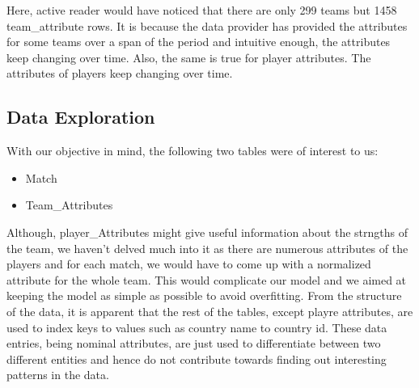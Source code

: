 \documentclass[11pt]{article}
\begin{document}
Here, active reader would have noticed that there are only 299 teams but 1458 team\_attribute rows. It is because the data provider has provided the attributes for some teams over a span of the period and intuitive enough, the attributes keep changing over time. Also, the same is true for player attributes. The attributes of players keep changing over time.
\subsection{Data Exploration}
With our objective in mind, the following two tables were of interest to us:
\begin{itemize}
  \setlength\itemsep{0em}
  \item Match
  \item Team\_Attributes
\end{itemize}
Although, player\_Attributes might give useful information about the strngths of the team, we haven't delved much into it as there are numerous attributes of the players and for each match, we would have to come up with a normalized attribute for the whole team. This would complicate our model and we aimed at keeping the model as simple as possible to avoid overfitting.
\newline
\newline
From the structure of the data, it is apparent that the rest of the tables, except playre attributes, are used to index keys to values such as country name to country id. These data entries, being nominal attributes, are just used to differentiate between two different entities and hence do not contribute towards finding out interesting patterns in the data.
\end{document}
